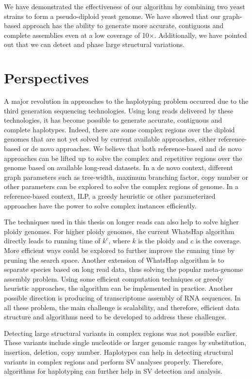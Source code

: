 We have demonstrated the effectiveness of our algorithm by combining two yeast strains to form a pseudo-diploid yeast genome.
We have showed that our graph-based approach has the ability to generate more accurate, contiguous and complete assemblies even at a low coverage of 10$\times$.
Additionally, we have pointed out that we can detect and phase large structural variations.

\section{Perspectives}
A major revolution in approaches to the haplotyping problem occurred due to the third generation sequencing technologies.
Using long reads delivered by these technologies, it has become possible to generate accurate, contiguous and complete haplotypes.
Indeed, there are some complex regions over the diploid genomes that are not yet solved by current available approaches, either reference-based or de novo approaches.
We believe that both reference-based and de novo approaches can be lifted up to solve the complex and repetitive regions over the genome based on available long-read datasets.
In a de novo context, different graph parameters such as tree-width, maximum branching factor, copy number or other parameters can be explored to solve the complex regions of genome.
In a reference-based context, ILP, a greedy heuristic or other parameterized approaches have the power to solve complex instances efficiently.

The techniques used in this thesis on longer reads can also help to solve higher ploidy genomes. For higher ploidy genomes, the current WhatsHap algorithm directly leads to running time of $k^c$, where $k$ is the ploidy and $c$ is the coverage.
More efficient ways could be explored to further improve the running time by pruning the search space.
Another extension of WhatsHap algorithm is to separate species based on long read data, thus solving the popular meta-genome assembly problem.
Using some efficient computation techniques or greedy heuristic approaches, the algorithm can be implemented in practice. 
Another possible direction is producing of transcriptome
assembly of RNA sequences. In all these problem, the main challenge is scalability, and therefore, efficient data structure and algorithms need to be developed to address these challenges.

Detecting large structural variants in complex regions was not possible earlier.
These variants include single nucleotide or larger genomic ranges by substitution, insertion, deletion, copy number. 
Haplotypes can help in detecting structural variants in complex regions and perform SV analyses properly.
Therefore, algorithms for haplotyping can further help in SV detection and analysis.

